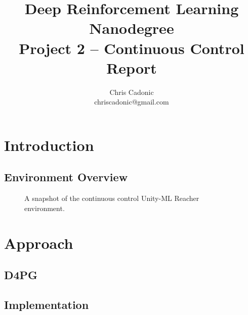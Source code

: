 \documentclass[11pt]{article}
\begin{document}
\title{Deep Reinforcement Learning Nanodegree\\
	   Project 2 -- Continuous Control Report}
\author{\vspace{-1mm}Chris Cadonic\\
chriscadonic@gmail.com}
\maketitle
\vspace{-1.5em}

\section{Introduction}

\subsection{Environment Overview}

\FloatBarrier

\begin{figure}[!ht]
	\centering
	\caption{A snapshot of the continuous control Unity-ML Reacher environment.}
	\label{fig:example-game-image}
\end{figure}

\FloatBarrier

\section{Approach}

\subsection{D4PG}

\subsection{Implementation}

 \FloatBarrier
 
 \begin{figure}[!ht]
 	\centering
 	\label{fig:nn-architecture}
 \end{figure}
 
 \FloatBarrier
 
\FloatBarrier
\end{document}
